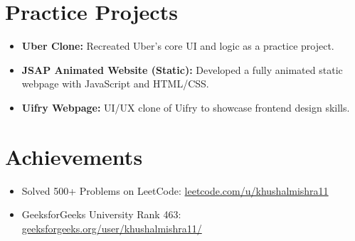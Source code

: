 \documentclass[a4paper,10pt]{article}
\begin{document}
\section*{Practice Projects}
\begin{itemize}[leftmargin=*]
  \item \textbf{Uber Clone:} Recreated Uber's core UI and logic as a practice project.
  \item \textbf{JSAP Animated Website (Static):} Developed a fully animated static webpage with JavaScript and HTML/CSS.
  \item \textbf{Uifry Webpage:} UI/UX clone of Uifry to showcase frontend design skills.
\end{itemize}

\section*{Achievements}
\begin{itemize}[leftmargin=*]
  \item Solved 500+ Problems on LeetCode: \href{https://www.leetcode.com/u/khushalmishra11}{leetcode.com/u/khushalmishra11}
  \item GeeksforGeeks University Rank 463: \href{https://www.geeksforgeeks.org/user/khushalmishra11/}{geeksforgeeks.org/user/khushalmishra11/}
\end{itemize}
\end{document}
